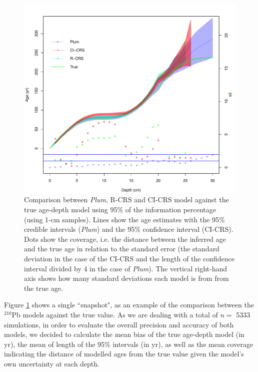\documentclass [10pt] {article}
\begin{document}
\begin{figure}[!]
	\centering
	\includegraphics[width=\linewidth]{95Comparison.pdf}
		\caption{Comparison between \textit{Plum}, R-CRS and CI-CRS model against the true age-depth model using 95\% of the information percentage (using 1-cm samples). Lines show the age estimates with the 95\% credible intervals (\textit{Plum}) and the 95\% confidence interval (CI-CRS). Dots show the coverage, i.e. the distance between the inferred age and the true age in relation to the standard error (the standard deviation in the case of the CI-CRS and the length of the confidence interval divided by 4 in the case of \textit{Plum}). The vertical right-hand axis shows how many standard deviations each model is from from the true age.  }
		\label{fig:comparison1r}
\end{figure}

Figure \ref{fig:comparison1r} shows a single ``snapshot", as an example of the comparison between the $^{210}$Pb models against the true value. 
As we are dealing with a total of $n =$ 5333 simulations, in order to evaluate the overall precision and accuracy of both models, we decided to calculate the mean bias of the true age-depth model (in yr), the mean of length of the 95\% intervals (in yr), as well as the mean coverage indicating the distance of modelled ages from the true value given the model's own uncertainty at each depth.  
\end{document}
